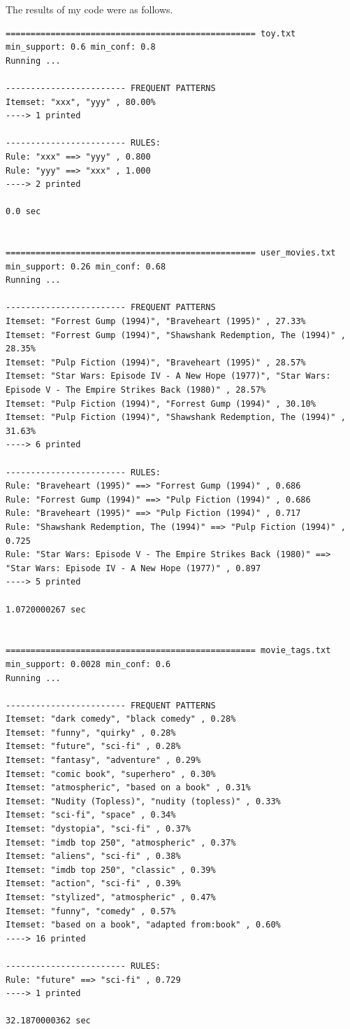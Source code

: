 \documentclass[12pt]{article}
\begin{document}
The results of my code were as follows.
\tiny
\begin{verbatim}
================================================== toy.txt
min_support: 0.6 min_conf: 0.8
Running ...

------------------------ FREQUENT PATTERNS
Itemset: "xxx", "yyy" , 80.00%
----> 1 printed

------------------------ RULES:
Rule: "xxx" ==> "yyy" , 0.800
Rule: "yyy" ==> "xxx" , 1.000
----> 2 printed

0.0 sec


================================================== user_movies.txt
min_support: 0.26 min_conf: 0.68
Running ...

------------------------ FREQUENT PATTERNS
Itemset: "Forrest Gump (1994)", "Braveheart (1995)" , 27.33%
Itemset: "Forrest Gump (1994)", "Shawshank Redemption, The (1994)" , 28.35%
Itemset: "Pulp Fiction (1994)", "Braveheart (1995)" , 28.57%
Itemset: "Star Wars: Episode IV - A New Hope (1977)", "Star Wars: Episode V - The Empire Strikes Back (1980)" , 28.57%
Itemset: "Pulp Fiction (1994)", "Forrest Gump (1994)" , 30.10%
Itemset: "Pulp Fiction (1994)", "Shawshank Redemption, The (1994)" , 31.63%
----> 6 printed

------------------------ RULES:
Rule: "Braveheart (1995)" ==> "Forrest Gump (1994)" , 0.686
Rule: "Forrest Gump (1994)" ==> "Pulp Fiction (1994)" , 0.686
Rule: "Braveheart (1995)" ==> "Pulp Fiction (1994)" , 0.717
Rule: "Shawshank Redemption, The (1994)" ==> "Pulp Fiction (1994)" , 0.725
Rule: "Star Wars: Episode V - The Empire Strikes Back (1980)" ==> "Star Wars: Episode IV - A New Hope (1977)" , 0.897
----> 5 printed

1.0720000267 sec


================================================== movie_tags.txt
min_support: 0.0028 min_conf: 0.6
Running ...

------------------------ FREQUENT PATTERNS
Itemset: "dark comedy", "black comedy" , 0.28%
Itemset: "funny", "quirky" , 0.28%
Itemset: "future", "sci-fi" , 0.28%
Itemset: "fantasy", "adventure" , 0.29%
Itemset: "comic book", "superhero" , 0.30%
Itemset: "atmospheric", "based on a book" , 0.31%
Itemset: "Nudity (Topless)", "nudity (topless)" , 0.33%
Itemset: "sci-fi", "space" , 0.34%
Itemset: "dystopia", "sci-fi" , 0.37%
Itemset: "imdb top 250", "atmospheric" , 0.37%
Itemset: "aliens", "sci-fi" , 0.38%
Itemset: "imdb top 250", "classic" , 0.39%
Itemset: "action", "sci-fi" , 0.39%
Itemset: "stylized", "atmospheric" , 0.47%
Itemset: "funny", "comedy" , 0.57%
Itemset: "based on a book", "adapted from:book" , 0.60%
----> 16 printed

------------------------ RULES:
Rule: "future" ==> "sci-fi" , 0.729
----> 1 printed

32.1870000362 sec
\end{verbatim}
\normalsize
\end{document}
